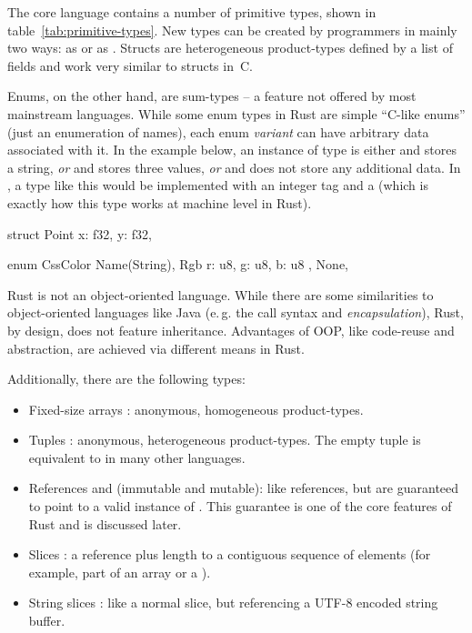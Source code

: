 The core language contains a number of primitive types, shown in table~\ref{tab:primitive-types}.
New types can be created by programmers in mainly two ways: as  or as .
Structs are heterogeneous product-types  defined by a list of fields and work very similar to structs in~C.

Enums, on the other hand, are sum-types -- a feature not offered by most mainstream languages.
While some enum types in Rust are simple \enquote{C-like enums} (just an enumeration of names), each enum \emph{variant} can have arbitrary data associated with it.
In the example below, an instance of type  is either  and stores a string, \emph{or}  and stores three  values, \emph{or}  and does not store any additional data.
In \cpp, a type like this would be implemented with an integer tag and a  (which is exactly how this type works at machine level in Rust).

\vspace{-3mm}
\begin{center}
\begin{minipage}[t]{.45\textwidth}
\begin{rustcode}
struct Point {
    x: f32,
    y: f32,
}
\end{rustcode}
\end{minipage}
\begin{minipage}[t]{.45\textwidth}
\begin{rustcode}
enum CssColor {
    Name(String),
    Rgb { r: u8, g: u8, b: u8 },
    None,
}
\end{rustcode}
\end{minipage}
\end{center}

Rust is not an object-oriented language.
While there are some similarities to object-oriented languages like Java (e.\,g. the  call syntax and \emph{encapsulation}), Rust, by design, does not feature inheritance.
Advantages of OOP, like code-reuse and abstraction, are achieved via different means in Rust.

\newpage
Additionally, there are the following types:
\vspace{-3mm}
\begin{itemize}
  \item Fixed-size arrays \code{[T; N]}: anonymous, homogeneous product-types.
  \item Tuples : anonymous, heterogeneous product-types. The empty tuple \code{()} is equivalent to  in many other languages.
  \item References  and  (immutable and mutable): like \cpp references, but are guaranteed to point to a valid instance of .
  This guarantee is one of the core features of Rust and is discussed later.
  \item Slices \code{&[T]}: a reference plus length to a contiguous sequence of elements (for example, part of an array or a ).
  \item String slices : like a normal slice, but referencing a UTF-8 encoded string buffer.
\end{itemize}

